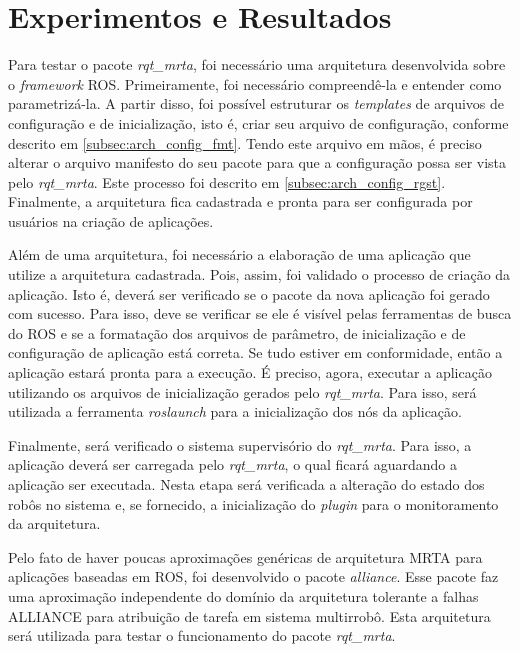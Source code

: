 \chapter[Experimentos e Resultados]{Experimentos e Resultados} \label{cap:resultados}
    Para testar o pacote \textit{rqt\_mrta}, foi necessário uma arquitetura desenvolvida sobre o \textit{framework} ROS. Primeiramente, foi necessário compreendê-la e entender como parametrizá-la. A partir disso, foi possível estruturar os \textit{templates} de arquivos de configuração e de inicialização, isto é, criar seu arquivo de configuração, conforme descrito em \ref{subsec:arch_config_fmt}. Tendo este arquivo em mãos, é preciso alterar o arquivo manifesto do seu pacote para que a configuração possa ser vista pelo \textit{rqt\_mrta}. Este processo foi descrito em \ref{subsec:arch_config_rgst}. Finalmente, a arquitetura fica cadastrada e pronta para ser configurada por usuários na criação de aplicações.
    
    Além de uma arquitetura, foi necessário a elaboração de uma aplicação que utilize a arquitetura cadastrada. Pois, assim, foi validado o processo de criação da aplicação. Isto é, deverá ser verificado se o pacote da nova aplicação foi gerado com sucesso. Para isso, deve se verificar se ele é visível pelas ferramentas de busca do ROS e se a formatação dos arquivos de parâmetro, de inicialização e de configuração de aplicação está correta. Se tudo estiver em conformidade, então a aplicação estará pronta para a execução. É preciso, agora, executar a aplicação utilizando os arquivos de inicialização gerados pelo \textit{rqt\_mrta}. Para isso, será utilizada a ferramenta \textit{roslaunch} para a inicialização dos nós da aplicação. 
    
    Finalmente, será verificado o sistema supervisório do \textit{rqt\_mrta}. Para isso, a aplicação deverá ser carregada pelo \textit{rqt\_mrta}, o qual ficará aguardando a aplicação ser executada. Nesta etapa será verificada a alteração do estado dos robôs no sistema e, se fornecido, a inicialização do \textit{plugin} para o monitoramento da arquitetura.
    
    Pelo fato de haver poucas aproximações genéricas de arquitetura MRTA para aplicações baseadas em ROS, foi desenvolvido o pacote \textit{alliance}. Esse pacote faz uma aproximação independente do domínio da arquitetura tolerante a falhas ALLIANCE \cite{ref:parker1998alliance} para atribuição de tarefa em sistema multirrobô. Esta arquitetura será utilizada para testar o funcionamento do pacote \textit{rqt\_mrta}. 
    
